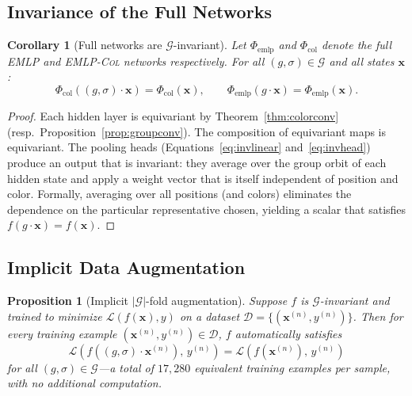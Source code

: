 \documentclass[11pt]{article}
\newtheorem{proposition}[theorem]{Proposition}
\newtheorem{corollary}[theorem]{Corollary}
\newcommand{\bx}{\mathbf{x}}
\begin{document}
\subsection{Invariance of the Full Networks}

\begin{corollary}[Full networks are $\mathcal{G}$-invariant]
\label{cor:invariance}
Let $\Phi_{\mathrm{emlp}}$ and $\Phi_{\mathrm{col}}$ denote the full
\textsc{EMLP} and \textsc{EMLP-Col} networks respectively.
For all $(g, \sigma) \in \mathcal{G}$ and all states $\bx$:
\begin{equation}
  \Phi_{\mathrm{col}}\!\left((g,\sigma)\cdot\bx\right) = \Phi_{\mathrm{col}}(\bx),
  \qquad
  \Phi_{\mathrm{emlp}}(g \cdot \bx) = \Phi_{\mathrm{emlp}}(\bx).
\end{equation}
\end{corollary}

\begin{proof}
Each hidden layer is equivariant by Theorem~\ref{thm:colorconv}
(resp.\ Proposition~\ref{prop:groupconv}).
The composition of equivariant maps is equivariant.
The pooling heads (Equations~\eqref{eq:invlinear} and~\eqref{eq:invhead})
produce an output that is invariant: they average over the group orbit of
each hidden state and apply a weight vector that is itself independent of
position and color.
Formally, averaging over all positions (and colors) eliminates the
dependence on the particular representative chosen, yielding a scalar that
satisfies $f(g \cdot \bx) = f(\bx)$.
\end{proof}

\subsection{Implicit Data Augmentation}

\begin{proposition}[Implicit $|\mathcal{G}|$-fold augmentation]
\label{prop:augmentation}
Suppose $f$ is $\mathcal{G}$-invariant and trained to minimize
$\mathcal{L}(f(\bx), y)$ on a dataset $\mathcal{D} = \{(\bx^{(n)}, y^{(n)})\}$.
Then for every training example $(\bx^{(n)}, y^{(n)}) \in \mathcal{D}$,
$f$ automatically satisfies
\begin{equation}
  \mathcal{L}\!\left(f\!\left((g,\sigma)\cdot\bx^{(n)}\right),\, y^{(n)}\right)
  = \mathcal{L}\!\left(f(\bx^{(n)}),\, y^{(n)}\right)
\end{equation}
for all $(g, \sigma) \in \mathcal{G}$—a total of $17{,}280$ equivalent
training examples per sample, with no additional computation.
\end{proposition}
\end{document}
